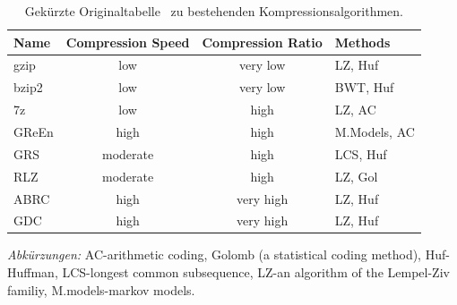 \documentclass[12pt]{article}
\newenvironment{tightcenter}{%
  \setlength\topsep{0pt}
  \setlength\parskip{0pt}
  \begin{center}
}{%
  \end{center}
}
\begin{document}
\begin{table}[h]
\caption{\label{tab:software}Gekürzte Originaltabelle~\cite{deorowicz13info} zu bestehenden Kompressionsalgorithmen.}
\begin{tightcenter}
\begin{tabular}{|l c c  l|}
	\toprule
	\bf Name & \bf Compression Speed      & \bf Compression Ratio & \bf Methods \\
	\midrule
	gzip & low & very low & LZ, Huf \\ 
	bzip2 & low & very low & BWT, Huf \\ 
	7z & low & high & LZ, AC \\ 
	GReEn & high & high & M.Models, AC \\ 
	GRS & moderate & high & LCS, Huf \\ 
	RLZ & moderate & high & LZ, Gol \\
	ABRC & high & very high & LZ, Huf \\ 
	GDC & high & very high & LZ, Huf \\
	\bottomrule 
\end{tabular}
\end{tightcenter}
\begin{tablenotes}
	\footnotesize
	\item \emph{Abkürzungen:} AC-arithmetic coding, Golomb (a statistical coding method), Huf-Huffman, LCS-longest common subsequence, LZ-an algorithm of the Lempel-Ziv familiy, M.models-markov models.
\end{tablenotes}
\end{table}
\end{document}
